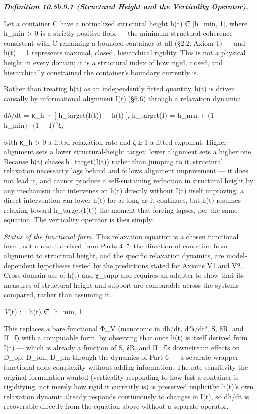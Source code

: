 \documentclass[
]{article}
\begin{document}
\emph{\textbf{Definition 10.5b.0.1 (Structural Height and the
Verticality Operator).}}

Let a container C have a normalized structural height h(t) ∈ {[}h\_min,
1{]}, where h\_min \textgreater{} 0 is a strictly positive floor --- the
minimum structural coherence consistent with C remaining a bounded
container at all (§2.2, Axiom 1) --- and h(t) = 1 represents maximal,
closed, hierarchical rigidity. This is not a physical height in every
domain; it is a structural index of how rigid, closed, and
hierarchically constrained the container's boundary currently is.

Rather than treating h(t) as an independently fitted quantity, h(t) is
driven causally by informational alignment I(t) (§6.6) through a
relaxation dynamic:

d\emph{h}/dt = κ\_h · {[} h\_target(I(t)) − h(t) {]}, h\_target(I) =
h\_min + (1 − h\_min)·(1 − I)\^{}ξ,

with κ\_h \textgreater{} 0 a fitted relaxation rate and ξ ≥ 1 a fitted
exponent. Higher alignment sets a lower structural-height target; lower
alignment sets a higher one. Because h(t) chases h\_target(I(t)) rather
than jumping to it, structural relaxation necessarily lags behind and
follows alignment improvement --- it does not lead it, and cannot
produce a self-sustaining reduction in structural height by any
mechanism that intervenes on h(t) directly without I(t) itself
improving: a direct intervention can lower h(t) for as long as it
continues, but h(t) resumes relaxing toward h\_target(I(t)) the moment
that forcing lapses, per the same equation. The verticality operator is
then simply:

\emph{Status of the functional form.} This relaxation equation is a
chosen functional form, not a result derived from Parts 4--7: the
direction of causation from alignment to structural height, and the
specific relaxation dynamics, are model-dependent hypotheses tested by
the predictions stated for Axioms V1 and V2. Cross-domain use of h(t)
and χ\_supp also requires an adapter to show that its measures of
structural height and support are comparable across the systems
compared, rather than assuming it.

\emph{V}(t) := h(t) ∈ {[}h\_min, 1{]}.

This replaces a bare functional Φ\_V (monotonic in dh/dt, d²h/dt², S,
δR, and Π\_f) with a computable form, by observing that once h(t) is
itself derived from I(t) --- which is already a function of S, δR, and
Π\_f's downstream effects on D\_op, D\_om, D\_pm through the dynamics of
Part 6 --- a separate wrapper functional adds complexity without adding
information. The rate-sensitivity the original formulation wanted
(verticality responding to how fast a container is rigidifying, not
merely how rigid it currently is) is preserved implicitly: h(t)'s own
relaxation dynamic already responds continuously to changes in I(t), so
dh/dt is recoverable directly from the equation above without a separate
operator.
\end{document}
